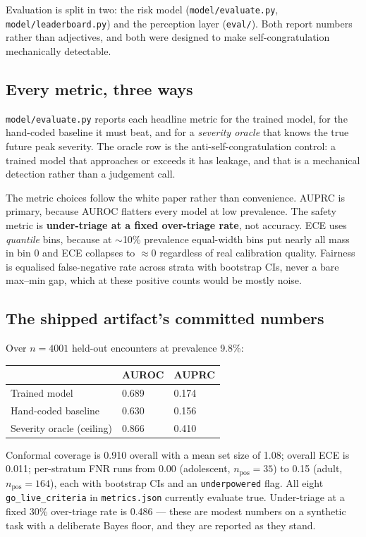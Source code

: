 \documentclass[10pt,a4paper,twocolumn]{article}
\newcommand{\pth}[1]{\textcolor{SecPurple}{\texttt{#1}}}
\newcommand{\cm}[1]{\texttt{#1}}
\begin{document}
Evaluation is split in two: the risk model (\pth{model/evaluate.py}, \pth{model/leaderboard.py})
and the perception layer (\pth{eval/}). Both report numbers rather than adjectives, and both were
designed to make self-congratulation mechanically detectable.

\subsection{Every metric, three ways}
\pth{model/evaluate.py} reports each headline metric for the trained model, for the hand-coded
baseline it must beat, and for a \emph{severity oracle} that knows the true future peak severity.
The oracle row is the anti-self-congratulation control: a trained model that approaches or exceeds
it has leakage, and that is a mechanical detection rather than a judgement call.

The metric choices follow the white paper rather than convenience. AUPRC is primary, because AUROC
flatters every model at low prevalence. The safety metric is \textbf{under-triage at a fixed
over-triage rate}, not accuracy. ECE uses \emph{quantile} bins, because at $\sim$10\% prevalence
equal-width bins put nearly all mass in bin 0 and ECE collapses to $\approx$0 regardless of real
calibration quality. Fairness is equalised false-negative rate across strata with bootstrap CIs,
never a bare max--min gap, which at these positive counts would be mostly noise.

\subsection{The shipped artifact's committed numbers}
Over $n=4001$ held-out encounters at prevalence 9.8\%:

\begin{center}\footnotesize\sffamily
\begin{tabular}{@{}p{2.9cm}p{1.5cm}p{1.5cm}@{}}
\toprule
\rowcolor{AccPurple!10}
\textbf{} & \textbf{AUROC} & \textbf{AUPRC}\\
\midrule
Trained model & 0.689 & 0.174\\
Hand-coded baseline & 0.630 & 0.156\\
Severity oracle (ceiling) & 0.866 & 0.410\\
\bottomrule
\end{tabular}
\end{center}

\vspace{3pt}
\noindent Conformal coverage is 0.910 overall with a mean set size of 1.08; overall ECE is 0.011;
per-stratum FNR runs from 0.00 (adolescent, $n_{\text{pos}}=35$) to 0.15 (adult,
$n_{\text{pos}}=164$), each with bootstrap CIs and an \cm{underpowered} flag. All eight
\cm{go\_live\_criteria} in \cm{metrics.json} currently evaluate true. Under-triage at a fixed 30\%
over-triage rate is 0.486 --- these are modest numbers on a synthetic task with a deliberate Bayes
floor, and they are reported as they stand.
\end{document}
